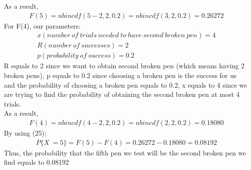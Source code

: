 \documentclass[12pt]{article}
\begin{document}
As a result, 
\begin{equation*} 
\begin{split}
F(5) = nbincdf(5-2,2,0.2) = nbincdf(3,2,0.2) = 0.26272
\end{split}
\end{equation*}
For F(4), our parameters:
\begin{equation*} 
\begin{split}
x (number \ of\ trials\ needed\ to\ have\ second\ broken\ pen) = 4 \\
R (number\ of\ successes) = 2 \\
p (probability\ of\ success) = 0.2
\end{split}
\end{equation*}
R equals to 2 since we want to obtain second broken pen (which means having 2 broken pens), p equals to 0.2 since choosing a broken pen is the success for us and the probability of choosing a broken pen equals to 0.2, x equals to 4 since we are trying to find the probability of obtaining the second broken pen at most 4 trials. \\
As a result, 
\begin{equation*} 
\begin{split}
F(4) = nbincdf(4-2,2,0.2) = nbincdf(2,2,0.2) = 0.18080
\end{split}
\end{equation*}
By using (25);
\begin{equation*} 
\begin{split}
P\{X\ = 5\} = F(5) - F(4) = 0.26272 - 0.18080 = 0.08192
\end{split}
\end{equation*}
Thus, the probability that the fifth pen we test will be the second broken pen we find equals to 0.08192
\end{document}
